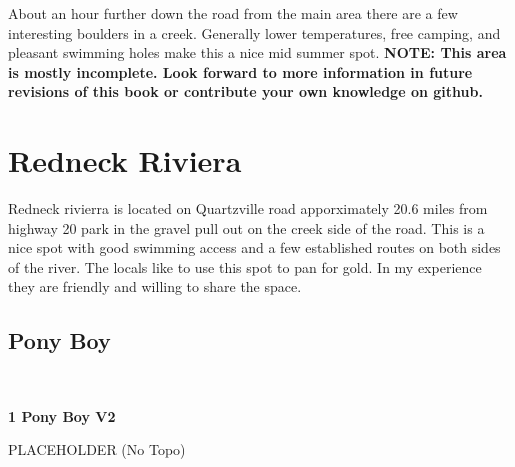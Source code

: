 \raggedcolumns
\begin{multicols}{2}
\begin{minipage}{\columnwidth}
About an hour further down the road from the main area there are a few interesting boulders in a creek. Generally lower temperatures, free camping, and pleasant swimming holes make this a nice mid summer spot.
\textbf{NOTE: This area is mostly incomplete. Look forward to more information in future revisions of this book or contribute your own knowledge on github.}
\end{minipage}

\newpage
		\section{Redneck Riviera}\label{sa:Redneck Riviera}
	\begin{minipage}{\columnwidth}
	Redneck rivierra is located on Quartzville road apporximately 20.6 miles from highway 20 park in the gravel pull out on the creek side of the road. This is a nice spot with good swimming access and a few established routes on both sides of the river. The locals like to use this spot to pan for gold. In my experience they are friendly and willing to share the space.
	\end{minipage}
	
			\begin{minipage}{\columnwidth}
			\subsection*{Pony Boy}\label{bf:Pony Boy}
			\
			
			\end{minipage}
			
					\begin{minipage}{\linewidth}	
					\label{rt:Pony Boy}
\colorbox{green!20}{
\parbox{0.95\textwidth}{
\textbf{
1 Pony Boy V2  
}
}
}

					\begin{adjustwidth}{0.5cm}{}				
					PLACEHOLDER
						\newline (No Topo) 
					\end{adjustwidth}
					\end{minipage}
			\begin{minipage}{\columnwidth}

\end{minipage}
\end{multicols}
